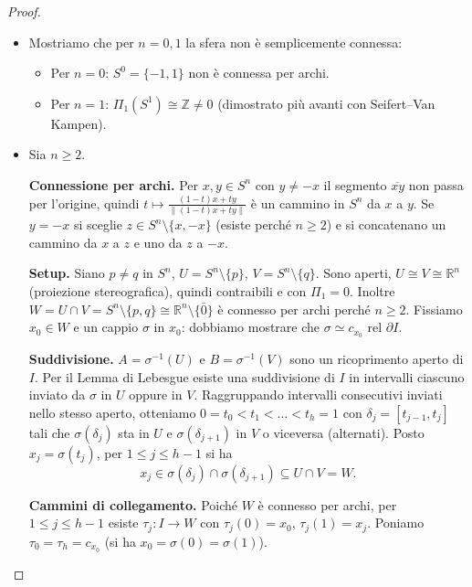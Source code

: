 \begin{proof}
\begin{itemize}
    \item[$\implies$)] Mostriamo che per $n = 0, 1$ la sfera non \`e semplicemente connessa:
    \begin{itemize}
        \item Per $n = 0$: $S^0 = \{-1, 1\}$ non è connessa per archi.
        \item Per $n = 1$: $\Pi_1(S^1) \cong \mathbb{Z} \neq 0$ (dimostrato pi\`u avanti con Seifert--Van Kampen).
    \end{itemize}

    \item[$\impliedby$)] Sia $n \geqslant 2$.

    \textbf{Connessione per archi.} Per $x, y \in S^n$ con $y \neq -x$ il segmento $\overline{xy}$ non passa per l'origine, quindi $t \mapsto \frac{(1-t)x + ty}{\|(1-t)x + ty\|}$ \`e un cammino in $S^n$ da $x$ a $y$. Se $y = -x$ si sceglie $z \in S^n \setminus \{x, -x\}$ (esiste perch\'e $n \geqslant 2$) e si concatenano un cammino da $x$ a $z$ e uno da $z$ a $-x$.

    \textbf{Setup.} Siano $p \neq q$ in $S^n$, $U = S^n \setminus \{p\}$, $V = S^n \setminus \{q\}$. Sono aperti, $U \cong V \cong \mathbb{R}^n$ (proiezione stereografica), quindi contraibili e con $\Pi_1 = 0$. Inoltre $W = U \cap V = S^n \setminus \{p,q\} \cong \mathbb{R}^n \setminus \{\bar 0\}$ \`e connesso per archi perch\'e $n \geqslant 2$. Fissiamo $x_0 \in W$ e un cappio $\sigma$ in $x_0$: dobbiamo mostrare che $\sigma \simeq c_{x_0}$ rel $\partial I$.

    \textbf{Suddivisione.} $A = \sigma^{-1}(U)$ e $B = \sigma^{-1}(V)$ sono un ricoprimento aperto di $I$. Per il Lemma di Lebesgue esiste una suddivisione di $I$ in intervalli ciascuno inviato da $\sigma$ in $U$ oppure in $V$. Raggruppando intervalli consecutivi inviati nello stesso aperto, otteniamo $0 = t_0 < t_1 < \dots < t_h = 1$ con $\delta_j = [t_{j-1}, t_j]$ tali che $\sigma(\delta_j)$ sta in $U$ e $\sigma(\delta_{j+1})$ in $V$ o viceversa (alternati). Posto $x_j = \sigma(t_j)$, per $1 \leqslant j \leqslant h-1$ si ha
    \[
    x_j \in \sigma(\delta_j) \cap \sigma(\delta_{j+1}) \subseteq U \cap V = W .
    \]

    \textbf{Cammini di collegamento.} Poich\'e $W$ \`e connesso per archi, per $1 \leqslant j \leqslant h-1$ esiste $\tau_j: I \to W$ con $\tau_j(0) = x_0$, $\tau_j(1) = x_j$. Poniamo $\tau_0 = \tau_h = c_{x_0}$ (si ha $x_0 = \sigma(0) = \sigma(1)$).


\end{itemize}
\end{proof}
